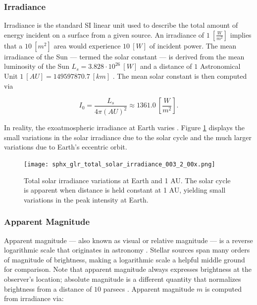 \subsubsection{Irradiance}

Irradiance is the standard SI linear unit used to describe the total amount of energy incident on a
surface from a given source. An irradiance of $1 \: \left[ \frac{W}{m^2} \right]$ implies that a $10
\: [m^2]$ area would experience $10 \: [W]$ of incident power. The mean irradiance of the Sun --- termed the solar constant --- is derived from the mean luminosity of the Sun $L_s = 3.828\cdot10^{26} \: [W]$ and a distance of $1$ Astronomical Unit $1 \: [AU] = 149597870.7 \: [km]$ \cite{frueh2019notes}. The mean solar constant is then computed via

\begin{equation} \label{eq:solar_constant_mean}
  I_0 = \frac{L_s}{4\pi \left(AU\right)^2} \approx 1361.0 \: \left[ \frac{W}{m^2} \right].
\end{equation}

In reality, the exoatmospheric irradiance at Earth varies \cite{frueh2019notes}. Figure \ref{fig:tsi} displays the small variations in the solar irradiance due to the solar cycle and the much larger variations due to Earth's eccentric orbit.

\begin{figure}[ht]
  \centering
  \texttt{[image: sphx\_glr\_total\_solar\_irradiance\_003\_2\_00x.png]}
  \caption{Total solar irradiance variations at Earth and 1 AU. The solar cycle is apparent when distance is held constant at 1 AU, yielding small variations in the peak intensity at Earth.}
  \label{fig:tsi}
\end{figure}

\subsubsection{Apparent Magnitude}

Apparent magnitude ---  also known as visual or relative magnitude --- is a reverse logarithmic scale
that originates in astronomy \cite{frueh2019notes}. Stellar sources span many orders of magnitude of brightness, making a
logarithmic scale a helpful middle ground for comparison. Note that apparent magnitude always
expresses brightness at the observer's location; absolute magnitude is a different quantity that
normalizes brightness from a distance of $10$ parsecs \cite{frueh2019notes}. Apparent magnitude $m$
is computed from irradiance via:

